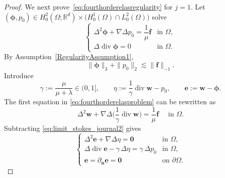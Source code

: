 \documentclass[10pt]{amsart}
\numberwithin{equation}{section}
\begin{document}
\begin{proof}
We next prove~\eqref{eq:fourthorderelasregularity} for $j=1$.
Let $(\boldsymbol\phi,p_0)\in H_0^2(\Omega;\mathbb R^d)\times
\big(H_0^1(\Omega)\cap L_0^2(\Omega)\big)$ solve
\begin{equation}\label{eq:limit_stokes_journal2}
\begin{cases}
\Delta^2\boldsymbol\phi+\nabla\Delta p_0=\dfrac{1}{\mu}\boldsymbol f
& \text{in }\Omega,\\[2pt]
\Delta\operatorname{div}\boldsymbol\phi=0 & \text{in }\Omega.
\end{cases}
\end{equation}
By Assumption~\ref{RegularityAssumption1},
\begin{equation}\label{eq:stokes_reg_journal2}
\|\boldsymbol\phi\|_{3}+\|p_0\|_{2}\lesssim\|\boldsymbol f\|_{-1}.
\end{equation}
Introduce
\[
\gamma:=\frac{\mu}{\mu+\lambda}\in(0,1],\qquad
\eta:=\frac{1}{\gamma}\operatorname{div}\boldsymbol w-p_0,\qquad \boldsymbol e:=\boldsymbol w-\boldsymbol\phi.
\]
The first equation in \eqref{eq:fourthorderelasproblem} can be rewritten as
\begin{equation}\label{eq:elas_rewrite_journal2}
\Delta^2\boldsymbol w+\nabla\Delta\Big(\frac{1}{\gamma}\operatorname{div}\boldsymbol w\Big)=\frac{1}{\mu}\boldsymbol f  \quad \textrm{ in } \Omega.
\end{equation}
Subtracting \eqref{eq:limit_stokes_journal2} gives
\begin{equation}\label{eq:error_system_journal2}
\begin{cases}
\Delta^2\boldsymbol e+\nabla\Delta\eta=\boldsymbol 0 & \text{in }\Omega,\\[2pt]
\Delta\operatorname{div}\boldsymbol e-\gamma\,\Delta\eta
=\gamma\,\Delta p_0& \text{in }\Omega,\\[2pt]
\boldsymbol e=\partial_{\boldsymbol n}\boldsymbol e=\boldsymbol 0 &\text{on }\partial\Omega.
\end{cases}
\end{equation}


\end{proof}
\end{document}
